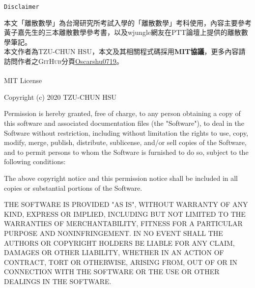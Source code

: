 \begin{center}
    \Huge{\texttt{Disclaimer}}\\
\end{center}

本文「離散數學」為台灣研究所考試入學的「離散數學」考科使用，內容主要參考黃子嘉先生的三本離散數學參考書\cite{1}\cite{2}\cite{3}，以及wjungle網友在PTT論壇上提供的離散數學筆記\cite{4}。 \\
本文作者為\textsc{TZU-CHUN HSU}，本文及其相關程式碼採用\textbf{MIT協議}，更多內容請訪問作者之\textsc{GitHub}分頁\href{https://github.com/Oscarshu0719}{Oscarshu0719}。 \\~\\

\con
MIT License

Copyright (c) 2020 TZU-CHUN HSU

Permission is hereby granted, free of charge, to any person obtaining a copy
of this software and associated documentation files (the "Software"), to deal
in the Software without restriction, including without limitation the rights
to use, copy, modify, merge, publish, distribute, sublicense, and/or sell
copies of the Software, and to permit persons to whom the Software is
furnished to do so, subject to the following conditions:

The above copyright notice and this permission notice shall be included in all
copies or substantial portions of the Software.

THE SOFTWARE IS PROVIDED "AS IS", WITHOUT WARRANTY OF ANY KIND, EXPRESS OR
IMPLIED, INCLUDING BUT NOT LIMITED TO THE WARRANTIES OF MERCHANTABILITY,
FITNESS FOR A PARTICULAR PURPOSE AND NONINFRINGEMENT. IN NO EVENT SHALL THE
AUTHORS OR COPYRIGHT HOLDERS BE LIABLE FOR ANY CLAIM, DAMAGES OR OTHER
LIABILITY, WHETHER IN AN ACTION OF CONTRACT, TORT OR OTHERWISE, ARISING FROM,
OUT OF OR IN CONNECTION WITH THE SOFTWARE OR THE USE OR OTHER DEALINGS IN THE
SOFTWARE.

\tnr
\pagebreak
